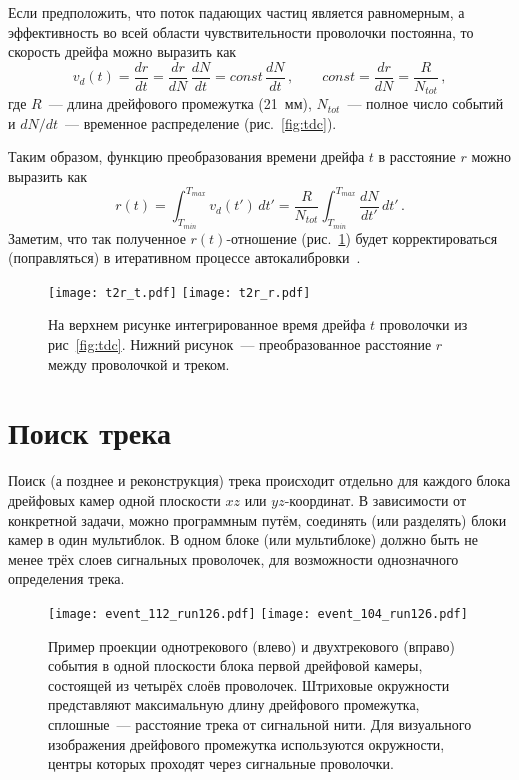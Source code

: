 Если предположить, что поток падающих частиц является равномерным, а
эффективность во всей области чувствительности проволочки постоянна, то скорость
дрейфа можно выразить как
\begin{equation}
  v_{d}(t) = \frac{dr}{dt} = \frac{dr}{dN}\,\frac{dN}{dt} =
  const\,\frac{dN}{dt}\,, \qquad
  const = \frac{dr}{dN} = \frac{R}{N_{tot}}\,,
\end{equation}
где $R$~--- длина дрейфового промежутка (21~мм), $N_{tot}$~--- полное число
событий и $dN/dt$~--- временное распределение (рис.~\ref{fig:tdc}).

Таким образом, функцию преобразования времени дрейфа $t$ в расстояние $r$ можно
выразить как
\begin{equation}
  r(t) = \int_{T_{min}}^{T_{max}} v_{d}(t')\,dt' = \frac{R}{N_{tot}}
  \int_{T_{min}}^{T_{max}} \frac{dN}{dt'}\,dt'\,.
\end{equation}
Заметим, что так полученное $r(t)$-отношение (рис.~\ref{fig:t2r}) будет
корректироваться (поправляться) в итеративном процессе
автокалибровки~\cite{gla_mucha10}.

\begin{figure}[h]
  \centering
  \texttt{[image: t2r\_t.pdf]}
  \texttt{[image: t2r\_r.pdf]}
  \caption{На верхнем рисунке интегрированное время дрейфа $t$ проволочки из
    рис~\ref{fig:tdc}. Нижний рисунок~--- преобразованное расстояние $r$ между
    проволочкой и треком.}
  \label{fig:t2r}
\end{figure}

\section{Поиск трека}
Поиск (а позднее и реконструкция) трека происходит отдельно для каждого блока
дрейфовых камер одной плоскости $xz$ или $yz$-координат. В зависимости от
конкретной задачи, можно программным путём, соединять (или разделять) блоки
камер в один мультиблок. В одном блоке (или мультиблоке) должно быть не менее
трёх слоев сигнальных проволочек, для возможности однозначного определения
трека.

\begin{figure}[h]
  \centering
  \texttt{[image: event\_112\_run126.pdf]} \hfill
  \texttt{[image: event\_104\_run126.pdf]}
  \caption{Пример проекции однотрекового (влево) и двухтрекового (вправо)
    события в одной плоскости блока первой дрейфовой камеры, состоящей из
    четырёх слоёв проволочек. Штриховые окружности представляют максимальную
    длину дрейфового промежутка, сплошные~--- расстояние трека от сигнальной
    нити. Для визуального изображения дрейфового промежутка используются
    окружности, центры которых проходят через сигнальные проволочки.}
  \label{fig:typo_2events}
\end{figure}

